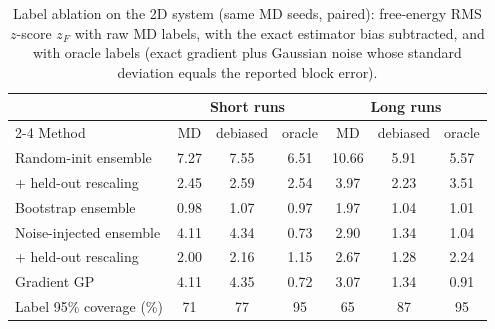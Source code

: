 \begin{table}
\caption{Label ablation on the 2D system (same MD seeds, paired): free-energy RMS $z$-score $z_F$ with raw MD labels,
with the exact estimator bias subtracted, and with oracle labels (exact gradient plus Gaussian noise whose standard
deviation equals the reported block error).}
\label{tab:ablation}
\begin{ruledtabular}
\begin{tabular}{lcccccc}
 & \multicolumn{3}{c}{Short runs} & \multicolumn{3}{c}{Long runs} \\
\cline{2-4}\cline{5-7}
Method & MD & debiased & oracle & MD & debiased & oracle \\
\hline
Random-init ensemble & 7.27 & 7.55 & 6.51 & 10.66 & 5.91 & 5.57 \\
\quad + held-out rescaling & 2.45 & 2.59 & 2.54 & 3.97 & 2.23 & 3.51 \\
Bootstrap ensemble & 0.98 & 1.07 & 0.97 & 1.97 & 1.04 & 1.01 \\
Noise-injected ensemble & 4.11 & 4.34 & 0.73 & 2.90 & 1.34 & 1.04 \\
\quad + held-out rescaling & 2.00 & 2.16 & 1.15 & 2.67 & 1.28 & 2.24 \\
Gradient GP & 4.11 & 4.35 & 0.72 & 3.07 & 1.34 & 0.91 \\
\hline
Label 95\% coverage (\%) & 71 & 77 & 95 & 65 & 87 & 95 \\
\end{tabular}
\end{ruledtabular}
\end{table}
